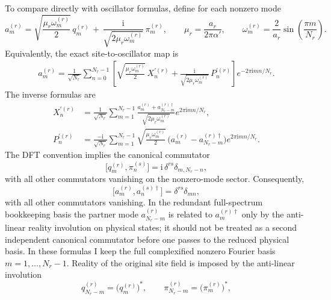 \documentclass[11pt]{article}
\numberwithin{equation}{section}
\newcommand{\al}{\alpha'}
\newcommand{\ii}{\mathrm{i}}
\begin{document}
To compare directly with oscillator formulas, define for each nonzero mode
\begin{equation}
\label{eq:s10-018}
a_m^{(r)}
=
\sqrt{\frac{\mu_r\omega_m^{(r)}}{2}}\,q_m^{(r)}
\,+\,
\frac{\ii}{\sqrt{2\mu_r\omega_m^{(r)}}}\,\pi_m^{(r)},
\qquad
\mu_r=\frac{a_r}{2\pi\al},
\qquad
\omega_m^{(r)}=\frac{2}{a_r}\sin\!\left(\frac{\pi m}{N_r}\right).
\end{equation}
Equivalently, the exact site-to-oscillator map is
\begin{equation}
\label{eq:s10-019}
\begin{aligned}
a_m^{(r)}
=
\frac{1}{\sqrt{N_r}}
\sum_{n=0}^{N_r-1}
\left[
\sqrt{\frac{\mu_r\omega_m^{(r)}}{2}}\,X_n^{\prime(r)}
+\frac{\ii}{\sqrt{2\mu_r\omega_m^{(r)}}}\,P_n^{\prime(r)}
\right]
e^{-2\pi \ii mn/N_r}.
\end{aligned}
\end{equation}
The inverse formulas are
\begin{equation}
\label{eq:s10-020}
\begin{aligned}
X_n^{\prime(r)}
&=
\frac{1}{\sqrt{N_r}}
\sum_{m=1}^{N_r-1}
\frac{a_m^{(r)}+a_{N_r-m}^{(r)\dagger}}{\sqrt{2\mu_r\omega_m^{(r)}}}
e^{2\pi \ii mn/N_r},\\
P_n^{\prime(r)}
&=
\frac{-\ii}{\sqrt{N_r}}
\sum_{m=1}^{N_r-1}
\sqrt{\frac{\mu_r\omega_m^{(r)}}{2}}\,
\bigl(a_m^{(r)}-a_{N_r-m}^{(r)\dagger}\bigr)
e^{2\pi \ii mn/N_r}.
\end{aligned}
\end{equation}
The DFT convention implies the canonical commutator
\begin{equation}
\label{eq:s10-021}
\bigl[q_m^{(r)},\pi_n^{(s)}\bigr]
=
\mathrm{i}\,\delta^{rs}\delta_{m,N_r-n},
\end{equation}
with all other commutators vanishing on the nonzero-mode sector. Consequently,
\begin{equation}
\label{eq:s10-022}
\bigl[a_m^{(r)},a_n^{(s)\dagger}\bigr]
=
\delta^{rs}\delta_{mn},
\end{equation}
with all other commutators vanishing. In the redundant full-spectrum bookkeeping basis the partner mode $a_{N_r-m}^{(r)}$ is related to $a_m^{(r)\dagger}$ only by the anti-linear reality involution on physical states; it should not be treated as a second independent canonical commutator before one passes to the reduced physical basis.
In these formulas I keep the full complexified nonzero Fourier basis $m=1,\dots,N_r-1$. Reality of the original site field is imposed by the anti-linear involution
\begin{equation}
\label{eq:s10-023}
q_{N_r-m}^{(r)}=\bigl(q_m^{(r)}\bigr)^*,
\qquad
\pi_{N_r-m}^{(r)}=\bigl(\pi_m^{(r)}\bigr)^*,
\end{equation}
\end{document}
